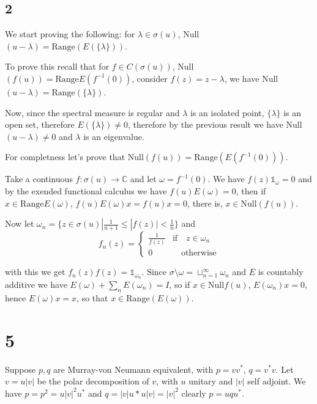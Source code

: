 \documentclass{article}
\begin{document}
\subsection*{2}

We start proving the following: for $\lambda\in \sigma(u)$, Null$(u-\lambda)=
\text{Range}(E(\{\lambda\}))$. 

To prove this recall that for $f\in C(\sigma(u))$, Null$(f(u))=\text{Range}
E(f^{-1}(0))$, consider $f(z)=z-\lambda$, we have Null$(u-\lambda)=\text{Range}
(\{\lambda\})$. 

Now, since the spectral measure is regular and $\lambda$ is an isolated point, 
$\{\lambda\}$ is an open set, therefore $E(\{\lambda\})\neq 0$, therefore by
the previous result we have Null$(u-\lambda)\neq 0$ and $\lambda$ is an eigenvalue.


For completness let's prove that Null$(f(u))=\text{Range}(E(f^{-1}(0)))$. 

Take a continuous $f:\sigma(u)\to \mathbb{C}$ and let $\omega=f^{-1}(0)$. 
We have $f(z)\mathds{1}_{\omega}=0$ and by the exended functional calculus we 
have $f(u)E(\omega)=0$, then if $x\in\text{Range}E(\omega)$, $f(u)E(\omega)x=
f(u)x=0$, there is, $x\in\text{Null}(f(u))$. 

Now let $\omega_n=\{z\in \sigma(u)|\frac{1}{n+1}\leq|f(z)|< \frac{1}{n}\}$
and \[f_n(z)=
\begin{cases}
    \frac{1}{f(z)} & \text{if}\quad z\in \omega_n \\
    0 & \quad \text{otherwise}
\end{cases}\]

with this we get $f_n(z)f(z)=\mathds{1}_{\omega_n}$. Since $\sigma\setminus
\omega=\sqcup_{n=1}^{\infty}\omega_n$ and $E$ is countably additive we have
$E(\omega)+\sum_n E(\omega_n)=I$, so if $x\in \text{Null}f(u)$, $E(\omega_n)x
=0$, hence $E(\omega)x=x$, so that $x\in \text{Range}(E(\omega))$.








\section*{5}

 \quad\quad   Suppose $p,q$ are Murray-von Neumann equivalent, with $p=vv^\ast$, $q=v^\ast v$. Let $v=u|v|$ be the polar
decomposition of $v$, with $u$ unitary and $|v|$ self adjoint. We have $p=p^2=u|v|^2u^\ast$ 
and $q=|v|u\ast u |v|=|v|^2$
clearly $p=uqu^\ast$.
\end{document}
